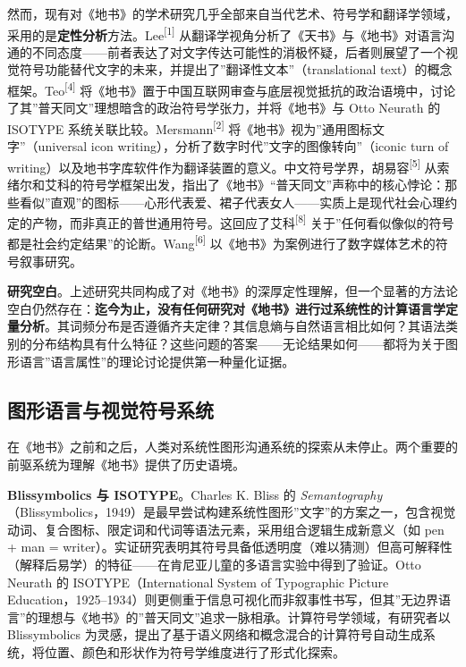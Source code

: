 \documentclass[12pt,a4paper,UTF8,fontset=founder]{ctexart}
\begin{document}
然而，现有对《地书》的学术研究几乎全部来自当代艺术、符号学和翻译学领域，采用的是\textbf{定性分析}方法。Lee\textsuperscript{{[}1{]}} 从翻译学视角分析了《天书》与《地书》对语言沟通的不同态度------前者表达了对文字传达可能性的消极怀疑，后者则展望了一个视觉符号功能替代文字的未来，并提出了''翻译性文本''（translational text）的概念框架。Teo\textsuperscript{{[}4{]}} 将《地书》置于中国互联网审查与底层视觉抵抗的政治语境中，讨论了其''普天同文''理想暗含的政治符号学张力，并将《地书》与 Otto Neurath 的 ISOTYPE 系统关联比较。Mersmann\textsuperscript{{[}2{]}} 将《地书》视为''通用图标文字''（universal icon writing），分析了数字时代''文字的图像转向''（iconic turn of writing）以及地书字库软件作为翻译装置的意义。中文符号学界，胡易容\textsuperscript{{[}5{]}} 从索绪尔和艾科的符号学框架出发，指出了《地书》``普天同文''声称中的核心悖论：那些看似''直观''的图标------心形代表爱、裙子代表女人------实质上是现代社会心理约定的产物，而非真正的普世通用符号。这回应了艾科\textsuperscript{{[}8{]}} 关于''任何看似像似的符号都是社会约定结果''的论断。Wang\textsuperscript{{[}6{]}} 以《地书》为案例进行了数字媒体艺术的符号叙事研究。

\textbf{研究空白}。上述研究共同构成了对《地书》的深厚定性理解，但一个显著的方法论空白仍然存在：\textbf{迄今为止，没有任何研究对《地书》进行过系统性的计算语言学定量分析}。其词频分布是否遵循齐夫定律？其信息熵与自然语言相比如何？其语法类别的分布结构具有什么特征？这些问题的答案------无论结果如何------都将为关于图形语言''语言属性''的理论讨论提供第一种量化证据。

\subsection{图形语言与视觉符号系统}\label{ux56feux5f62ux8bedux8a00ux4e0eux89c6ux89c9ux7b26ux53f7ux7cfbux7edf}

在《地书》之前和之后，人类对系统性图形沟通系统的探索从未停止。两个重要的前驱系统为理解《地书》提供了历史语境。

\textbf{Blissymbolics 与 ISOTYPE}。Charles K. Bliss 的 \emph{Semantography}（Blissymbolics，1949）是最早尝试构建系统性图形''文字''的方案之一，包含视觉动词、复合图标、限定词和代词等语法元素，采用组合逻辑生成新意义（如 pen + man = writer）。实证研究表明其符号具备低透明度（难以猜测）但高可解释性（解释后易学）的特征------在肯尼亚儿童的多语言实验中得到了验证。Otto Neurath 的 ISOTYPE（International System of Typographic Picture Education，1925--1934）则更侧重于信息可视化而非叙事性书写，但其''无边界语言''的理想与《地书》的''普天同文''追求一脉相承。计算符号学领域，有研究者以 Blissymbolics 为灵感，提出了基于语义网络和概念混合的计算符号自动生成系统，将位置、颜色和形状作为符号学维度进行了形式化探索。
\end{document}
